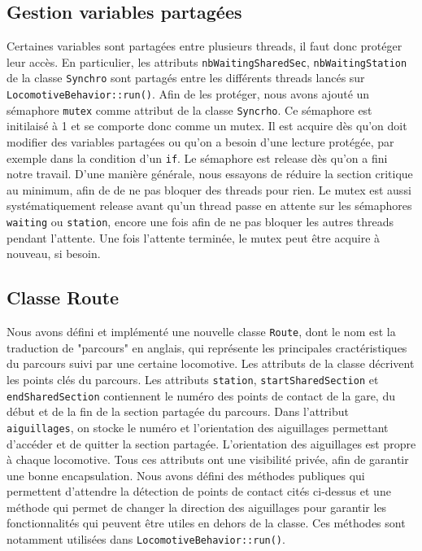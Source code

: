 \documentclass{article}
\begin{document}
\subsection*{Gestion variables partagées}
Certaines variables sont partagées entre plusieurs threads, il faut donc protéger leur accès. En particulier, les attributs
\texttt{nbWaitingSharedSec}, \texttt{nbWaitingStation} de la classe \texttt{Synchro} sont partagés entre les différents threads lancés sur 
\texttt{LocomotiveBehavior::run()}. Afin de les protéger, nous avons ajouté un sémaphore \texttt{mutex} comme attribut de la
classe \texttt{Syncrho}. Ce sémaphore est initilaisé à 1 et se comporte donc comme un mutex. Il est acquire dès qu'on doit 
modifier des variables partagées ou qu'on a besoin d'une lecture protégée, par exemple dans la condition d'un \texttt{if}.
Le sémaphore est release dès qu'on a fini notre travail. D'une manière générale, nous essayons de réduire la section critique
au minimum, afin de de ne pas bloquer des threads pour rien. Le mutex est aussi systématiquement release avant qu'un thread passe 
en attente sur les sémaphores \texttt{waiting} ou \texttt{station}, encore une fois afin de ne pas bloquer les autres threads pendant
l'attente. Une fois l'attente terminée, le mutex peut être acquire à nouveau, si besoin.

\subsection*{Classe Route}
Nous avons défini et implémenté une nouvelle classe \texttt{Route}, dont le nom est la traduction de "parcours" en anglais, qui 
représente les principales cractéristiques du parcours suivi par une certaine locomotive. Les attributs de la classe 
décrivent les points clés du parcours. Les attributs \texttt{station}, \texttt{startSharedSection} et \texttt{endSharedSection}
contiennent le numéro des points de contact de la gare, du début et de la fin de la section partagée du parcours. Dans l'attribut
\texttt{aiguillages}, on stocke le numéro et l'orientation des aiguillages permettant d'accéder et de quitter la section partagée.
L'orientation des aiguillages est propre à chaque locomotive. Tous ces attributs ont une visibilité privée, afin de garantir une
bonne encapsulation. Nous avons défini des méthodes publiques qui permettent d'attendre la détection de points de contact cités
ci-dessus et une méthode qui permet de changer la direction des aiguillages pour garantir les fonctionnalités qui peuvent être
utiles en dehors de la classe. Ces méthodes sont notamment utilisées dans \texttt{LocomotiveBehavior::run()}.
\end{document}
